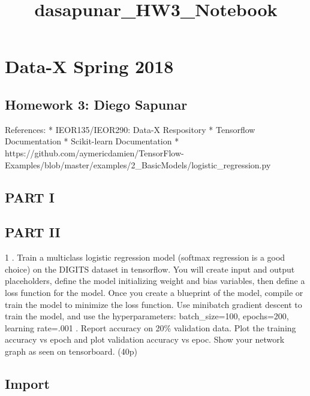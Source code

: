 \documentclass[11pt]{article}
\title{dasapunar\_HW3\_Notebook}
\begin{document}
    
    
    \maketitle
    
    

    
    \hypertarget{data-x-spring-2018}{%
\section{Data-X Spring 2018}\label{data-x-spring-2018}}

\hypertarget{homework-3-diego-sapunar}{%
\subsection{Homework 3: Diego Sapunar}\label{homework-3-diego-sapunar}}

References: * IEOR135/IEOR290: Data-X Respository * Tensorflow
Documentation * Scikit-learn Documentation *
https://github.com/aymericdamien/TensorFlow-Examples/blob/master/examples/2\_BasicModels/logistic\_regression.py

    \hypertarget{part-i}{%
\subsection{PART I}\label{part-i}}

    \hypertarget{part-ii}{%
\subsection{PART II}\label{part-ii}}

    1 . Train a multiclass logistic regression model (softmax regression is
a good choice) on the DIGITS dataset in tensorflow. You will create
input and output placeholders, define the model initializing weight and
bias variables, then define a loss function for the model. Once you
create a blueprint of the model, compile or train the model to minimize
the loss function. Use minibatch gradient descent to train the model,
and use the hyperparameters: batch\_size=100, epochs=200, learning
rate=.001 . Report accuracy on 20\% validation data. Plot the training
accuracy vs epoch and plot validation accuracy vs epoc. Show your
network graph as seen on tensorboard. (40p)

    \hypertarget{import}{%
\subsection{Import}\label{import}}
\end{document}
